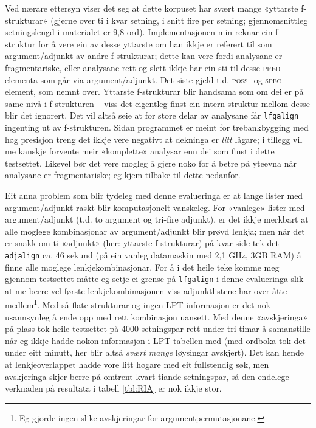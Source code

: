 \documentclass[11pt,a4paper,oneside,draft]{report}
\newcommand{\F}[2]{\textsc{#1}\ensuremath{_{#2}}}
\newcommand{\SPEC}{\F{spec}{}}
\newcommand{\POSS}{\F{poss}{}}
\newcommand{\PRED}{\F{pred}{}}
\begin{document}
 Ved nærare ettersyn viser det seg at dette korpuset har svært mange
 «yttarste f-strukturar» (gjerne over ti i kvar setning, i snitt fire
 per setning; gjennomsnittleg setningslengd i materialet er 9,8
 ord). Implementasjonen min reknar ein f-struktur for å vere ein av
 desse yttarste om han ikkje er referert til som argument/adjunkt av
 andre f-strukturar; dette kan vere fordi analysane er fragmentariske,
 eller analysane rett og slett ikkje har ein sti til desse
 \PRED{}-elementa som går via argument/adjunkt. Det siste gjeld t.d.
 \POSS{}- og \SPEC{}-element, som nemnt over.  Yttarste f-strukturar
 blir handsama som om dei er på same nivå i f-strukturen -- viss det
 eigentleg finst ein intern struktur mellom desse blir det
 ignorert. Det vil altså seie at for store delar av analysane får
 \texttt{lfgalign} ingenting ut av f-strukturen.  Sidan programmet er meint
 for trebankbygging med høg presisjon treng det ikkje vere negativt at
 dekninga er \emph{litt} lågare; i tillegg vil me kanskje forvente meir
 «komplette» analysar enn dei som finst i dette testsettet. Likevel
 bør det vere mogleg å gjere noko for å betre på yteevna når analysane
 er fragmentariske; eg kjem tilbake til dette nedanfor.

 Eit anna problem som blir tydeleg med denne evalueringa er at lange
 lister med argument/adjunkt raskt blir komputasjonelt vanskeleg. For
 «vanlege» lister med argument/adjunkt (t.d. to argument og tri-fire
 adjunkt), er det ikkje merkbart at alle moglege kombinasjonar av
 argument/adjunkt blir prøvd lenkja; men når det er snakk om ti
 «adjunkt» (her: yttarste f-strukturar) på kvar side tek det
 \texttt{adjalign} ca. 46 sekund (på ein vanleg datamaskin med 2,1 GHz, 3GB
 RAM) å finne alle moglege lenkjekombinasjonar. For å i det heile teke
 komme meg gjennom testsettet måtte eg setje ei grense på \texttt{lfgalign} i
 denne evalueringa slik at me berre vel første lenkjekombinasjonen
 viss adjunktlistene har over åtte medlem\footnote{Eg gjorde ingen slike avskjeringar for argumentpermutasjonane. }. Med så flate
 strukturar og ingen LPT-informasjon er det nok usannsynleg å ende opp
 med rett kombinasjon uansett. Med denne «avskjeringa» på plass tok
 heile testsettet på 4000 setningspar rett under tri timar å
 samanstille når eg ikkje hadde nokon informasjon i LPT-tabellen med
 (med ordboka tok det under eitt minutt, her blir altså \emph{svært mange}
 løysingar avskjert). Det kan hende at lenkjeoverlappet hadde vore
 litt høgare med eit fullstendig søk, men avskjeringa skjer berre på
 omtrent kvart tiande setningspar, så den endelege verknaden på
 resultata i tabell \ref{tbl:RIA} er nok ikkje stor.
\end{document}
